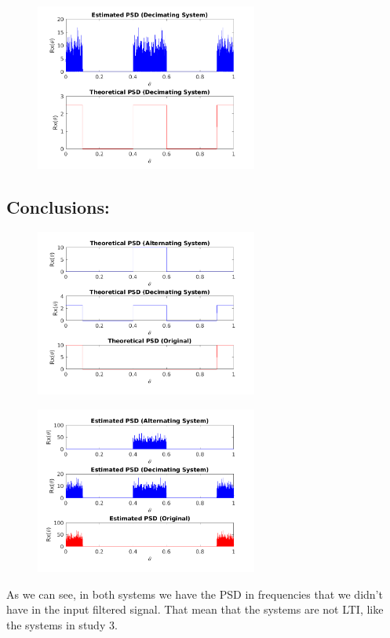 \documentclass[a4paper,11pt]{article}
\begin{document}
\begin{figure}[!hp]
    \begin{center}
      \includegraphics[width=0.65\textwidth]{images/study4/comp_psd_d.png}
    \end{center}
\end{figure}

\newpage

\subsection{Conclusions:}

\begin{figure}[!hp]
    \begin{center}
      \includegraphics[width=0.65\textwidth]{images/study4/comp_psd_th.png}
    \end{center}
\end{figure}

\begin{figure}[!hp]
    \begin{center}
      \includegraphics[width=0.65\textwidth]{images/study4/comp_psd_es.png}
    \end{center}
\end{figure}

As we can see, in both systems we have the PSD in frequencies that we didn't
have in the input filtered signal. That mean that the systems are not LTI, like
the systems in study 3.

\vspace{4cm}
\end{document}
